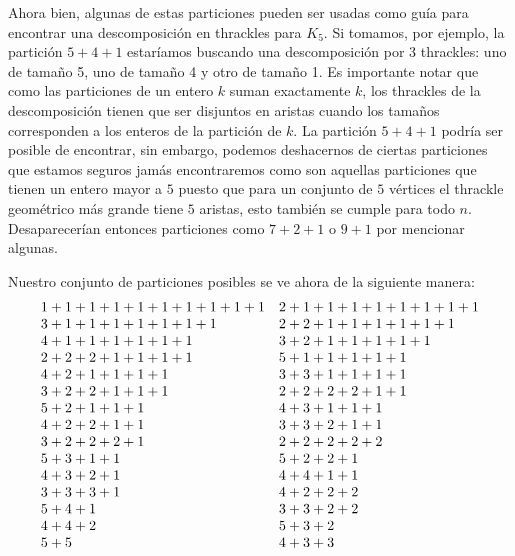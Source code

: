 Ahora bien, algunas de estas particiones pueden ser usadas como guía para encontrar
una descomposición en thrackles para $K_5$. Si tomamos, por ejemplo, la partición $5+4+1$
estaríamos buscando una descomposición por 3 thrackles: uno de tamaño 5, uno de tamaño 4
y otro de tamaño 1. Es importante notar que como las particiones de un entero $k$
suman exactamente $k$, los thrackles de la descomposición tienen que ser disjuntos en aristas
cuando los tamaños corresponden a los enteros de la partición de $k$.
La partición $5+4+1$ podría ser posible de encontrar, sin embargo, podemos
deshacernos de ciertas particiones que estamos seguros jamás encontraremos como son
aquellas particiones que tienen un entero mayor a $5$ puesto que para un conjunto
de $5$ vértices el thrackle geométrico más grande tiene $5$ aristas, esto también se cumple
para todo $n$. Desaparecerían entonces particiones como $7+2+1$ o $9+1$ por mencionar algunas.

Nuestro conjunto de particiones posibles se ve ahora de la siguiente manera:
\[
\begin{array}{l l}
  1 + 1 + 1 + 1 + 1 + 1 + 1 + 1 + 1 + 1 & 2 + 1 + 1 + 1 + 1 + 1 + 1 + 1 + 1\\
  3 + 1 + 1 + 1 + 1 + 1 + 1 + 1         & 2 + 2 + 1 + 1 + 1 + 1 + 1 + 1    \\
  4 + 1 + 1 + 1 + 1 + 1 + 1             & 3 + 2 + 1 + 1 + 1 + 1 + 1        \\
  2 + 2 + 2 + 1 + 1 + 1 + 1             & 5 + 1 + 1 + 1 + 1 + 1            \\
  4 + 2 + 1 + 1 + 1 + 1                 & 3 + 3 + 1 + 1 + 1 + 1            \\
  3 + 2 + 2 + 1 + 1 + 1                 & 2 + 2 + 2 + 2 + 1 + 1            \\
  5 + 2 + 1 + 1 + 1                     & 4 + 3 + 1 + 1 + 1                \\
  4 + 2 + 2 + 1 + 1                     & 3 + 3 + 2 + 1 + 1                \\
  3 + 2 + 2 + 2 + 1                     & 2 + 2 + 2 + 2 + 2                \\
  5 + 3 + 1 + 1                         & 5 + 2 + 2 + 1                    \\
  4 + 3 + 2 + 1                         & 4 + 4 + 1 + 1                    \\
  3 + 3 + 3 + 1                         & 4 + 2 + 2 + 2                    \\
  5 + 4 + 1                             & 3 + 3 + 2 + 2                    \\
  4 + 4 + 2                             & 5 + 3 + 2                        \\
  5 + 5                                 & 4 + 3 + 3
\end{array}
\]

